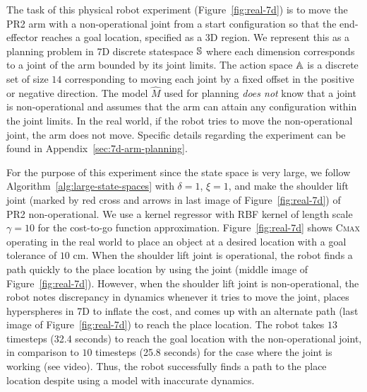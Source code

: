 The task of this physical robot experiment (Figure~\ref{fig:real-7d}) is
to move the PR2 arm with a
non-operational joint from a start configuration so that the
end-effector reaches a goal location, specified as a 3D
region. We represent this as a planning problem in 7D
discrete statespace $\mathbb{S}$ where each dimension corresponds to
a joint of the arm bounded by its joint limits. The action space
$\mathbb{A}$ is a discrete set of size 
$14$ corresponding to moving each joint by a fixed offset in the
positive or negative direction. The model $\hat{M}$ used for
planning \textit{does not} know that a joint is non-operational and
assumes that the arm can attain any configuration within the joint
limits. In the real world, if the robot tries to move the
non-operational joint, the arm does not move. Specific details regarding the experiment can
be found in Appendix~\ref{sec:7d-arm-planning}.

For the purpose of this
experiment since the state space is very large, we follow Algorithm~\ref{alg:large-state-spaces} with $\delta
= 1$, $\xi = 1$, and make the shoulder lift joint (marked by red cross and arrows
in last image of Figure~\ref{fig:real-7d}) of PR2 non-operational. We use a
kernel regressor with RBF kernel of length scale $\gamma = 10$ for
the cost-to-go function approximation. Figure~\ref{fig:real-7d} shows \textsc{Cmax} operating in the
real world to place an object at a desired location with a goal
tolerance of $10$ cm. When the shoulder lift joint is operational, the robot finds a
path quickly to the place location by using the joint (middle image of
Figure~\ref{fig:real-7d}). However, when the shoulder lift joint is
non-operational, the robot notes discrepancy in dynamics whenever it tries to
move the joint, places hyperspheres in 7D to inflate the cost, and
comes up with an alternate path (last image of
Figure~\ref{fig:real-7d}) to reach the place location. The 
robot takes $13$ timesteps (32.4 seconds) to reach the goal location with the
non-operational joint, in comparison to $10$ timesteps (25.8 seconds) for the case
where the joint is working (see video). Thus,
the robot successfully finds a path to the place location despite using a
model with inaccurate dynamics.

